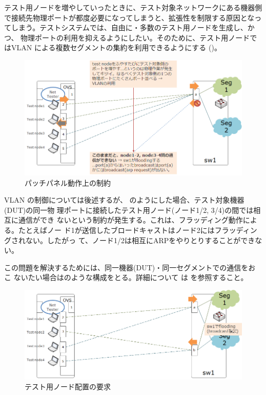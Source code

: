 テスト用ノードを増やしていったときに、テスト対象ネットワークにある機器側
で接続先物理ポートが都度必要になってしまうと、拡張性を制限する原因となっ
てしまう。テストシステムでは、自由に・多数のテスト用ノードを生成し、かつ、
物理ポートの利用を抑えるようにしたい。そのために、テスト用ノードではVLAN
による複数セグメントの集約を利用できるようにする
()。

\begin{figure}[h]
 \centering
 \includegraphics[scale=0.6]{img/l2bcctrl_req2.png}
 \caption{パッチパネル動作上の制約}
 \label{fig:l2bcctrl_req2}
\end{figure}

VLAN の制御については後述するが、
のようにした場合、テスト対象機器(DUT)の同一物
理ポートに接続したテスト用ノード(ノード1/2, 3/4)の間では相互に通信ができ
ないという制約が発生する。これは、フラッディング動作による。たとえばノー
ド1が送信したブロードキャストはノード2にはフラッディングされない。したがっ
て、ノード1/2は相互にARPをやりとりすることができない。

この問題を解決するためには、同一機器(DUT)・同一セグメントでの通信をおこ
ないたい場合はのような構成をとる。詳細について
は \lopjtech を参照すること。

\begin{figure}[h]
 \centering
 \includegraphics[scale=0.6]{img/l2bcctrl_req3.png}
 \caption{テスト用ノード配置の要求}
 \label{fig:l2bcctrl_req3}
\end{figure}

